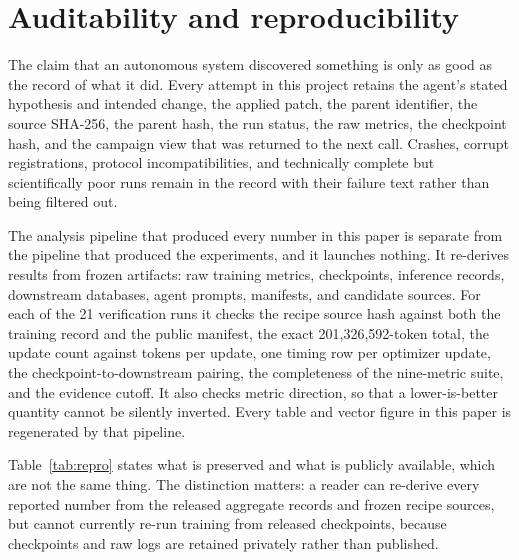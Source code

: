 \documentclass{article}
\begin{document}
\section{Auditability and reproducibility}\label{sec:repro}
The claim that an autonomous system discovered something is only as good as the record of what it did. Every attempt in this project retains the agent's stated hypothesis and intended change, the applied patch, the parent identifier, the source SHA-256, the parent hash, the run status, the raw metrics, the checkpoint hash, and the campaign view that was returned to the next call. Crashes, corrupt registrations, protocol incompatibilities, and technically complete but scientifically poor runs remain in the record with their failure text rather than being filtered out.

The analysis pipeline that produced every number in this paper is separate from the pipeline that produced the experiments, and it launches nothing. It re-derives results from frozen artifacts: raw training metrics, checkpoints, inference records, downstream databases, agent prompts, manifests, and candidate sources. For each of the 21 verification runs it checks the recipe source hash against both the training record and the public manifest, the exact 201,326,592-token total, the update count against tokens per update, one timing row per optimizer update, the checkpoint-to-downstream pairing, the completeness of the nine-metric suite, and the evidence cutoff. It also checks metric direction, so that a lower-is-better quantity cannot be silently inverted. Every table and vector figure in this paper is regenerated by that pipeline.

Table~\ref{tab:repro} states what is preserved and what is publicly available, which are not the same thing. The distinction matters: a reader can re-derive every reported number from the released aggregate records and frozen recipe sources, but cannot currently re-run training from released checkpoints, because checkpoints and raw logs are retained privately rather than published.
\end{document}
